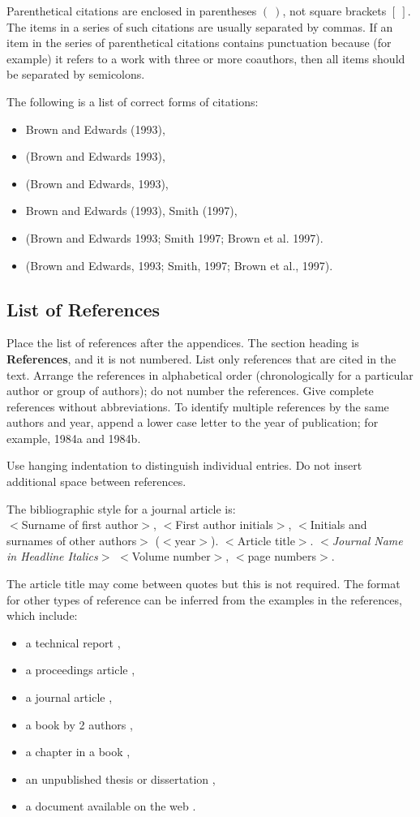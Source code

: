 \documentclass[a4paper,11pt]{article}
\theoremstyle{plain}
\theoremstyle{definition}
\begin{document}
Parenthetical citations are enclosed in parentheses $(~)$, not square brackets $[~]$.
The items in a series of such citations are usually separated by commas.
If an item in the series of parenthetical citations contains punctuation 
because (for example) it refers to a work with three or more coauthors, 
then all items should be separated by semicolons.

The following is a list of correct forms of citations:
\begin{itemize}
\setlength\itemsep{-1mm}
\item Brown and Edwards (1993),
\item (Brown and Edwards 1993),
\item (Brown and Edwards, 1993),
\item Brown and Edwards (1993), Smith (1997),
\item (Brown and Edwards 1993; Smith 1997; Brown et al. 1997).
\item (Brown and Edwards, 1993; Smith, 1997; Brown et al., 1997).
\end{itemize}

\subsection{List of References}
Place the list of references after the appendices.
The section heading is \textbf{References}, and it is not numbered.
List only references that are cited in the text.
Arrange the references in alphabetical order (chronologically for a
particular author or group of authors); do not number the references.
Give complete references without abbreviations.
To identify multiple references by the same authors and year, append a
lower case letter to the year of publication; for example, 1984a and 1984b.

Use hanging indentation to distinguish individual entries.
Do not insert additional space between references.

The bibliographic style for a journal article is: \\
$<$Surname of first author$>$, $<$First author initials$>$,
$<$Initials and surnames of other authors$>$ ($<$year$>$).
$<$Article title$>$. $<${\em Journal Name in
Headline Italics}$>$ $<$Volume number$>$, $<$page numbers$>$.

The article title may come between quotes but this is not required.
The format for other types of reference can be inferred from the
examples in the references, which include:
\begin{itemize}
\setlength\itemsep{-1mm}
\item a technical report \citep{chi89},
\item a proceedings article \citep{evkekro07},
\item a journal article \citep{alon},
\item a book by 2 authors \citep{asmus07},
\item a chapter in a book \citep{asrub1},
\item an unpublished thesis or dissertation \citep{garvels00},
\item a document available on the web \citep{sudoku}.
\end{itemize}
\end{document}
